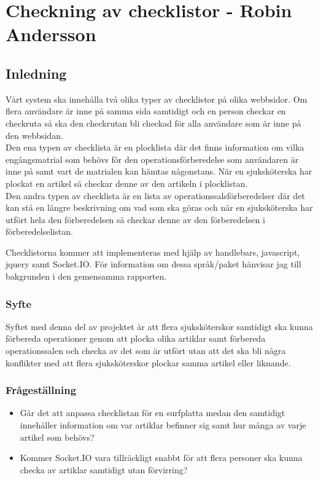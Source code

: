 \section{Checkning av checklistor - Robin Andersson}
\subsection{Inledning}
Vårt system ska innehålla två olika typer av checklistor på olika webbsidor. Om flera användare är inne på samma sida samtidigt och en person checkar en checkruta så ska den checkrutan bli checkad för alla användare som är inne på den webbsidan.\\

Den ena typen av checklista är en plocklista där det finns information om vilka engångsmatrial som behövs för den operationsförberedelse som användaren är inne på samt vart de matrialen kan hämtas någonstans. När en sjuksköterska har plockat en artikel så checkar denne av den artikeln i plocklistan.\\

Den andra typen av checklista är en lista av operationssalsförberedelser där det kan stå en längre beskrivning om vad som ska göras och när en sjuksköterska har utfört hela den förberedelsen så checkar denne av den förberedelsen i förberedelselistan.

Checklistorna kommer att implementeras med hjälp av handlebars, javascript, jquery samt Socket.IO. För information om dessa språk/paket hänvisar jag till bakgrunden i den gemensamma rapporten.

\subsubsection{Syfte}
Syftet med denna del av projektet är att flera sjuksköterskor samtidigt ska kunna förbereda operationer genom att plocka olika artiklar samt förbereda operationssalen och checka av det som är utfört utan att det ska bli några konflikter med att flera sjuksköterskor plockar samma artikel eller liknande.

\subsubsection{Frågeställning}
\begin{itemize}
\item Går det att anpassa checklistan för en surfplatta medan den samtidigt innehåller information om var artiklar befinner sig samt hur många av varje artikel som behövs?

\item Kommer Socket.IO vara tillräckligt snabbt för att flera personer ska kunna checka av artiklar samtidigt utan förvirring?
\end{itemize}

